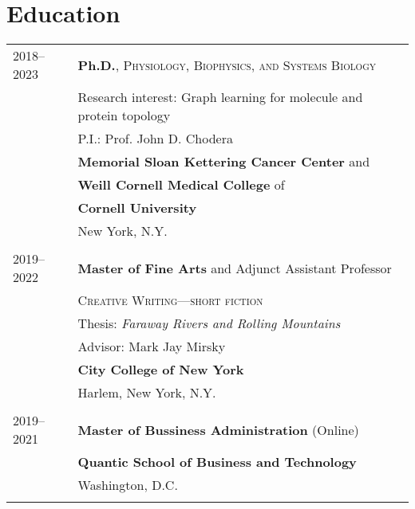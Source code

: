\section{Education}
\begin{longtable}{p{} p{} }

\textsc{2018--2023} & \textbf{Ph.D.}, \textsc{Physiology, Biophysics, and Systems Biology}\\
                 & Research interest: Graph learning for molecule and protein topology\\
                 & P.I.: Prof. John D. Chodera\\
                 & \textbf{Memorial Sloan Kettering Cancer Center} and \\
                 & \textbf{Weill Cornell Medical College} of \\
                 & \textbf{Cornell University} \\
                 & New York, N.Y.\\\\
                 
\textsc{2019--2022} & \textbf{Master of Fine Arts} and Adjunct Assistant Professor \\
                 & \textsc{Creative Writing---short fiction} \\
                 & Thesis: \textit{Faraway Rivers and Rolling Mountains} \\
                 & Advisor: Mark Jay Mirsky \\
                 & \textbf{City College of New York} \\
                 & Harlem, New York, N.Y.\\\\
                 
\textsc{2019--2021} & \textbf{Master of Bussiness Administration} (Online)\\
                 & \textbf{Quantic School of Business and Technology} \\
                 & Washington, D.C.\\\\
                 


\end{longtable}
